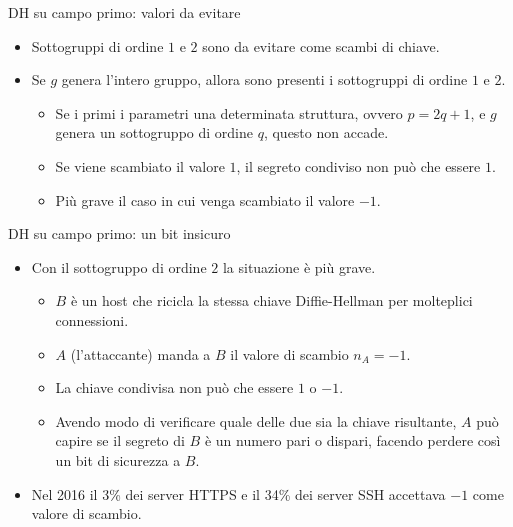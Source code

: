 \documentclass[11pt,svgnames,smaller,aspectratio=169,italian]{beamer}
\begin{document}
\begin{frame}{DH su campo primo: valori da evitare}
	\begin{itemize}
		\item Sottogruppi di ordine $1$ e $2$ sono da evitare come scambi di chiave.
		\item Se $g$ genera l'intero gruppo, allora sono presenti i sottogruppi di ordine $1$ e $2$.
			\begin{itemize}
				\item Se i primi i parametri una determinata struttura, ovvero $p = 2q + 1$, e $g$ genera un sottogruppo di ordine $q$, questo non accade.
				\item Se viene scambiato il valore $1$, il segreto condiviso non può che essere $1$.
				\item Più grave il caso in cui venga scambiato il valore $-1$.
			\end{itemize}
	\end{itemize}
\end{frame}

\begin{frame}{DH su campo primo: un bit insicuro}
	\begin{itemize}
		\item Con il sottogruppo di ordine $2$ la situazione è più grave.
			\begin{itemize}
				\item $B$ è un host che ricicla la stessa chiave Diffie-Hellman per molteplici connessioni.
				\item $A$ (l'attaccante) manda a $B$ il valore di scambio $n_{A} = -1$.
				\item La chiave condivisa non può che essere $1$ o $-1$.
				\item Avendo modo di verificare quale delle due sia la chiave risultante, $A$ può capire se il segreto di $B$ è un numero pari o dispari, facendo perdere così un bit di sicurezza a $B$.
			\end{itemize}
		\item Nel 2016 il 3\% dei server HTTPS e il 34\% dei server SSH accettava $-1$ come valore di scambio.
	\end{itemize}
\end{frame}
\end{document}

